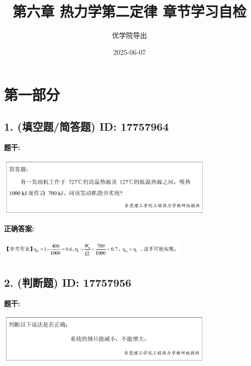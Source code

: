 \documentclass[12pt]{article}
\title{第六章 热力学第二定律 章节学习自检}
\author{优学院导出}
\date{2025-06-07}
\begin{document}
\maketitle

\section*{第一部分}
\hrulefill

\subsection*{1. (填空题/简答题) \small ID: 17757964}

\textbf{题干:}


\begin{center}\includegraphics[width=0.8\textwidth, height=0.25\textheight, keepaspectratio]{question_1_17757964/title_img_1.png}\end{center}

\textbf{正确答案:}

\begin{center}\includegraphics[width=0.7\textwidth, height=0.2\textheight, keepaspectratio]{question_1_17757964/correct_answer_1_img_1.png}\end{center}

\vspace{0.5em}\hrulefill\vspace{1em}

\subsection*{2. (判断题) \small ID: 17757956}

\textbf{题干:}


\begin{center}\includegraphics[width=0.8\textwidth, height=0.25\textheight, keepaspectratio]{question_2_17757956/title_img_1.png}\end{center}
\end{document}
